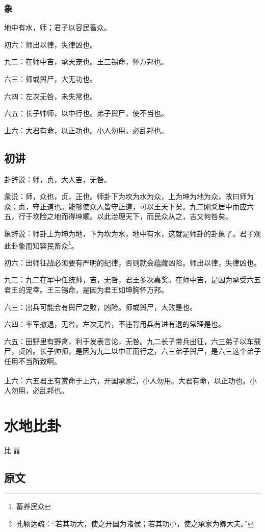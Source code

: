 \documentclass[12pt,oneside]{book}
\begin{document}
\subsection{象}
地中有水，师；君子以容民畜众。

初六：师出以律，失律凶也。

九二：在师中吉，承天宠也。王三锡命，怀万邦也。

六三：师或舆尸，大无功也。

六四：左次无咎，未失常也。

六五：长子帅师，以中行也。弟子舆尸，使不当也。

上六：大君有命，以正功也。小人勿用，必乱邦也。

\section{初讲}
卦辞说：师，贞，大人吉，无咎。

彖说：师，众也，贞，正也。师卦下为坎为水为众，上为坤为地为众，故曰师为众；贞，守正道也。能够使众人皆守正道，可以王天下矣。九二刚爻居中而应六五，行于坎险之地而得坤顺。以此治理天下，而民众从之，吉又何咎矣。

象辞说：师卦上为坤为地，下为坎为水，地中有水，这就是师卦的卦象了。君子观此卦象而知容民畜众\footnote{畜养民众}。

初六：出师征战必须要有严明的纪律，否则就会蕴藏凶险。师出以律，失律凶也。

九二：九二在军中任统帅，吉，无咎，君王多次嘉奖。在师中吉，是因为承受六五君王的宠幸。王三锡命，是因为君王如坤胸怀万邦。

六三：出兵可能会有舆尸之败，凶险。师或舆尸，大败是也。

六四：率军撤退，无咎。左次无咎，不违背用兵有进有退的常理是也。

六五：田野里有野禽，利于发表言论，无咎。九二长子带兵出征，六三弟子以车载尸，贞凶。长子帅师，是因为九二以中正而行之，六三弟子舆尸，是六三这个弟子任用不当所致啊。

上六：六五君王有赏命于上六，开国承家\footnote{孔颖达疏：“若其功大，使之开国为诸侯；若其功小，使之承家为卿大夫。”}，小人勿用。大君有命，以正功也。小人勿用，必乱邦也。



\chapter{水地比卦}
比 {\Large ䷇}

\section{原文}
\end{document}
